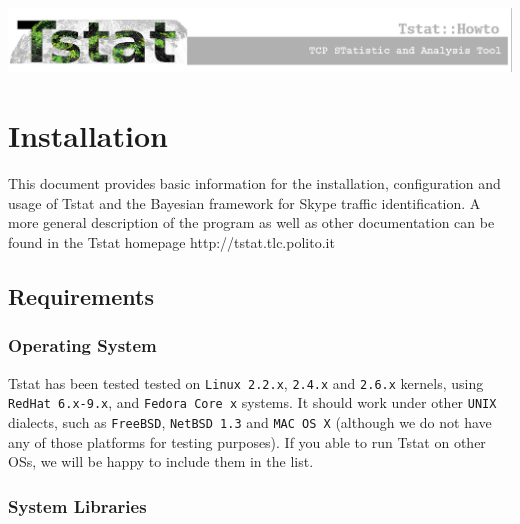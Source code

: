 \documentclass[11pt]{article}
\begin{document}
    \begin{center}
        \includegraphics[width=\textwidth]{tstat_banner.eps}
    \end{center}
    \tableofcontents
    


\clearpage

       \selectfont


\section{Installation\label{Installation}}


This document provides basic information
for the installation, configuration and usage 
of Tstat and the Bayesian framework for Skype
traffic identification.  A more general
description of the program as well as other
documentation can be found in the Tstat homepage
\textsf{http://tstat.tlc.polito.it}

\subsection{Requirements\label{Requirements}}
\subsubsection{Operating System\label{Operating_System}}


Tstat has been tested tested on \texttt{Linux 2.2.x}, \texttt{2.4.x} and \texttt{2.6.x} kernels, 
using \texttt{RedHat 6.x-9.x}, and \texttt{Fedora Core x} systems. 
It should work under other \texttt{UNIX} dialects, such as 
\texttt{FreeBSD}, \texttt{NetBSD 1.3} and \texttt{MAC OS X} (although we do not have any of 
those platforms for testing purposes). If you able to run Tstat on other OSs, we
will be happy to include them in the list.

\subsubsection{System Libraries\label{System_Libraries}}
\end{document}
